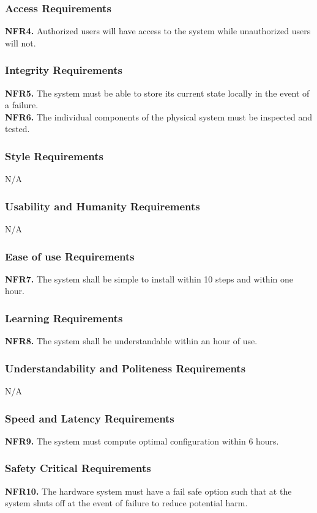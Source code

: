 \documentclass[12pt, titlepage]{article}
\begin{document}
\subsubsection{Access Requirements}
\textbf{NFR4.} Authorized users will have access to the system while unauthorized users will not.

\subsubsection{Integrity Requirements}
\textbf{NFR5.} The system must be able to store its current state locally in the event of a failure.\\
\textbf{NFR6.} The individual components of the physical system must be inspected and tested.

\subsubsection{Style Requirements}
N/A
\subsubsection{Usability and Humanity Requirements}
N/A
\subsubsection{Ease of use Requirements}
\textbf{NFR7.} The system shall be simple to install within 10 steps and within one hour.

\subsubsection{Learning Requirements}
\textbf{NFR8.} The system shall be understandable within an hour of use.

\subsubsection{Understandability and Politeness Requirements}
N/A

\subsubsection{Speed and Latency Requirements}
\textbf{NFR9.} The system must compute optimal configuration within 6 hours.

\subsubsection{Safety Critical Requirements}
\textbf{NFR10.} The hardware system must have a fail safe option such that at the system shuts off at the event of failure to reduce potential harm.
\end{document}
